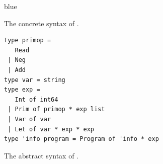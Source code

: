 \documentclass[11pt]{book}
\newcommand{\ocaml}[1]{{\color{blue}{#1}}}
\newenvironment{ocamlx}{
  \begin{color}{blue}
}
{
  \end{color}
}
\begin{document}
\begin{figure}[tp]
\centering
{}
\begin{ocamlx}
\end{ocamlx}
\caption{The concrete syntax of \LangVar{} \ocaml{in OCaml}.}
\label{fig:r1-concrete-syntax}
\end{figure}

\begin{figure}[tp]
\centering
{}
\begin{lstlisting}[style=ocaml,frame=single]
type primop = 
   Read
 | Neg
 | Add
type var = string
type exp = 
   Int of int64  
 | Prim of primop * exp list
 | Var of var
 | Let of var * exp * exp
type 'info program = Program of 'info * exp
\end{lstlisting}
\caption{The abstract syntax of \LangVar{}.}
\label{fig:r1-syntax}
\end{figure}
\end{document}
